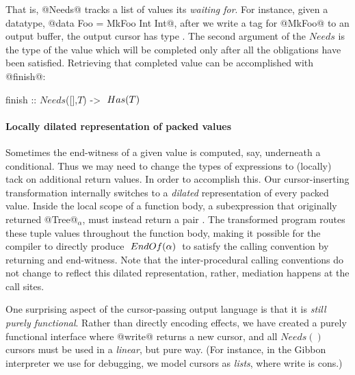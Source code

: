 \documentclass[a4paper,english]{lipics-v2016}
\newcommand{\treelang}{Gibbon\xspace} %
\newcommand{\fresh}[1]{\ensuremath{#1}}
\newcommand{\freshA}{\fresh{\alpha}}
\begin{document}
That is, @Needs@ tracks a list of values its {\em waiting for}.  For instance,
given a datatype, @data Foo = MkFoo Int Int@, after we write a tag for @MkFoo@
to an output buffer, the output cursor has type .
The second argument of the $Needs$ is the type of the value which will be
completed only after all the obligations have been satisfied.  Retrieving that
completed value can be accomplished with @finish@:

\begin{code}
  finish :: $Needs$([],$T$) -> $\; Has(T) \;$
\end{code}


\paragraph*{Locally dilated representation of packed values}

Sometimes the end-witness of a given value is computed, say, underneath a
conditional.  Thus we may need to change the types of expressions to (locally)
tack on additional return values.
%
In order to accomplish this.  Our cursor-inserting transformation internally
switches to a {\em dilated} representation of every packed value.  Inside the
local scope of a function body, a subexpression that originally returned @Tree@$_\freshA$,
must instead return a pair \il{($Has$(Tree$_\freshA$), $\ENDOF{\freshA}$)}.
%
The transformed program routes these tuple values throughout the function body,
making it possible for the compiler to directly produce $\ENDOF{\freshA}$ to
satisfy the calling convention by returning and end-witness.
%
Note that the inter-procedural calling conventions do not change to reflect this
dilated representation, rather, mediation happens at the call sites.


One surprising aspect of the cursor-passing output language is that it is {\em
  still purely functional}.  Rather than directly encoding effects, we have
created a purely functional interface where @write@ returns a new cursor, and
all $Needs()$ cursors must be used in a {\em linear}, but pure way.
%
(For instance, in the \treelang interpreter we use for debugging, we model cursors as {\em
  lists}, where write is cons.)

\newcommand{\END}[1]{\ensuremath{\overline{#1}}}


\end{document}
